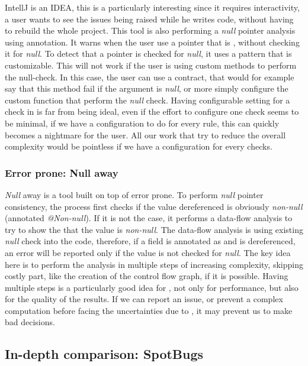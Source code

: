 IntellJ is an IDEA, this is a particularly interesting since it requires interactivity, a user wants to see the issues being raised while he writes code, without having to rebuild the whole project. 
This tool is also performing a \emph{null} pointer analysis using annotation. 
It warns when the user use a pointer that is \nullable{}, without checking it for \emph{null}. 
To detect that a pointer is checked for \emph{null}, it uses a pattern that is customizable. 
This will not work if the user is using custom methods to perform the null-check. 
In this case, the user can use a contract, that would for example say that this method fail if the argument is \emph{null}, or more simply configure the custom function that perform the \emph{null} check.\newline
Having configurable setting for a check in \slang{} is far from being ideal, even if the effort to configure one check seems to be minimal, if we have a configuration to do for every rule, this can quickly becomes a nightmare for the user. 
All our work that try to reduce the overall complexity would be pointless if we have a configuration for every checks.


\subsubsection{Error prone: Null away}
\label{subsubsec:error_prone}

\emph{Null} away is a tool built on top of error prone. 
To perform \emph{null} pointer consistency, the process first checks if the value dereferenced is obviously \emph{non-null} (annotated \emph{@Non-null}). 
If it is not the case, it performs a data-flow analysis to try to show the that the value is \emph{non-null}. 
The data-flow analysis is using existing \emph{null} check into the code, therefore, if a field is annotated as \nullable{} and is dereferenced, an error will be reported only if the value is not checked for \emph{null}. \newline
The key idea here is to perform the analysis in multiple steps of increasing complexity, skipping costly part, like the creation of the control flow graph, if it is possible.
Having multiple steps is a particularly good idea for \slang{}, not only for performance, but also for the quality of the results. 
If we can report an issue, or prevent a complex computation before facing the uncertainties due to \slang{}, it may prevent us to make bad decisions.

\subsection{In-depth comparison: SpotBugs}
\label{subsec:indpeth_comparison_spotbugs}

